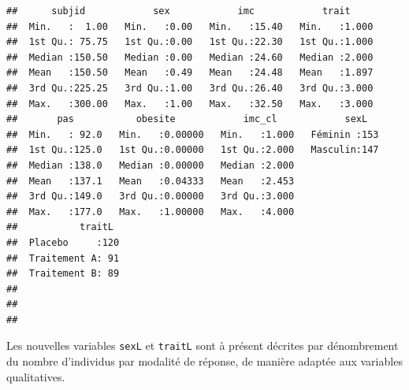 \documentclass[
]{book}
\newenvironment{Shaded}{\begin{snugshade}}{\end{snugshade}}
\newcommand{\AttributeTok}[1]{\textcolor[rgb]{0.13,0.29,0.53}{#1}}
\newcommand{\DocumentationTok}[1]{\textcolor[rgb]{0.56,0.35,0.01}{\textbf{\textit{#1}}}}
\newcommand{\FunctionTok}[1]{\textcolor[rgb]{0.13,0.29,0.53}{\textbf{#1}}}
\newcommand{\NormalTok}[1]{#1}
\newcommand{\OtherTok}[1]{\textcolor[rgb]{0.56,0.35,0.01}{#1}}
\newcommand{\SpecialCharTok}[1]{\textcolor[rgb]{0.81,0.36,0.00}{\textbf{#1}}}
\newcommand{\StringTok}[1]{\textcolor[rgb]{0.31,0.60,0.02}{#1}}
\begin{document}
\begin{Shaded}
\end{Shaded}

\begin{verbatim}
##      subjid            sex            imc            trait      
##  Min.   :  1.00   Min.   :0.00   Min.   :15.40   Min.   :1.000  
##  1st Qu.: 75.75   1st Qu.:0.00   1st Qu.:22.30   1st Qu.:1.000  
##  Median :150.50   Median :0.00   Median :24.60   Median :2.000  
##  Mean   :150.50   Mean   :0.49   Mean   :24.48   Mean   :1.897  
##  3rd Qu.:225.25   3rd Qu.:1.00   3rd Qu.:26.40   3rd Qu.:3.000  
##  Max.   :300.00   Max.   :1.00   Max.   :32.50   Max.   :3.000  
##       pas           obesite            imc_cl            sexL    
##  Min.   : 92.0   Min.   :0.00000   Min.   :1.000   Féminin :153  
##  1st Qu.:125.0   1st Qu.:0.00000   1st Qu.:2.000   Masculin:147  
##  Median :138.0   Median :0.00000   Median :2.000                 
##  Mean   :137.1   Mean   :0.04333   Mean   :2.453                 
##  3rd Qu.:149.0   3rd Qu.:0.00000   3rd Qu.:3.000                 
##  Max.   :177.0   Max.   :1.00000   Max.   :4.000                 
##           traitL   
##  Placebo     :120  
##  Traitement A: 91  
##  Traitement B: 89  
##                    
##                    
## 
\end{verbatim}

Les nouvelles variables \texttt{sexL} et \texttt{traitL} sont à présent décrites par dénombrement du nombre d'individus par modalité de réponse, de manière adaptée aux variables qualitatives.
\end{document}
